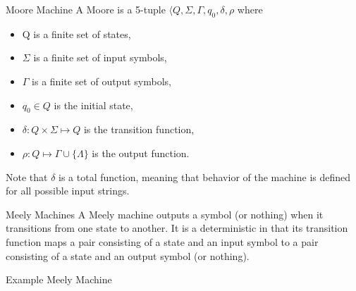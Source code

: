 \documentclass{beamer}
\begin{document}
\begin{frame}{Moore Machine}
A Moore is a 5-tuple $\langle Q, \Sigma, \Gamma, q_0, \delta,\rho$ where
\begin{itemize}
  \item Q is a finite set of states,
  \item $\Sigma$ is a finite set of input symbols,
  \item $\Gamma$ is a finite set of output symbols,
  \item $q_0\in Q$ is  the initial state,
  \item $\delta:Q\times \Sigma\mapsto Q$ is  the transition function,
  \item $\rho: Q \mapsto\Gamma\cup\{\Lambda\}$ is the output function. 
\end{itemize}
Note that $\delta$ is a total function,
meaning that behavior of the machine is defined
for all possible input strings. 
\end{frame}

\begin{frame}{Meely Machines}
A Meely machine outputs a symbol (or nothing) when it transitions from one state to another. 
It is a deterministic in that its transition function maps 
a pair consisting of a state and an input symbol to a pair consisting of a state and an output symbol (or nothing).  
\end{frame}

\begin{frame}{Example Meely Machine}
\begin{center}
%
\end{center}
\end{frame}
\end{document}
